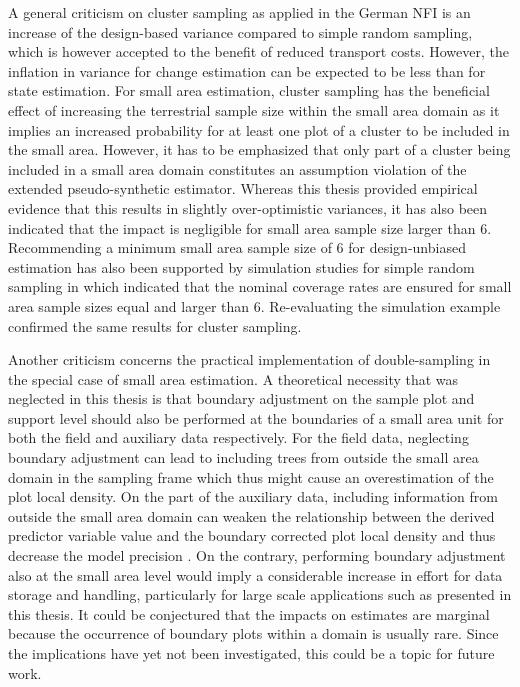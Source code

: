 A general criticism on cluster sampling as applied in the German NFI is an increase of the design-based variance compared to simple random sampling, which is however accepted to the benefit of reduced transport costs. However, the inflation in variance for change estimation can be expected to be less than for state estimation. For small area estimation, cluster sampling has the beneficial effect of increasing the terrestrial sample size within the small area domain as it implies an increased probability for at least one plot of a cluster to be included in the small area. However, it has to be emphasized that only part of a cluster being included in a small area domain constitutes an assumption violation of the extended pseudo-synthetic estimator. Whereas this thesis provided empirical evidence that this results in slightly over-optimistic variances, it has also been indicated that the impact is negligible for small area sample size larger than 6. Recommending a minimum small area sample size of 6 for design-unbiased estimation has also been supported by simulation studies for simple random sampling in \citet{mandallaz2013b} which indicated that the nominal coverage rates are ensured for small area sample sizes equal and larger than 6. Re-evaluating the simulation example confirmed the same results for cluster sampling.\par 

Another criticism concerns the practical implementation of double-sampling in the special case of small area estimation. A theoretical necessity that was neglected in this thesis is that boundary adjustment on the sample plot and support level should also be performed at the boundaries of a small area unit for both the field and auxiliary data respectively. For the field data, neglecting boundary adjustment can lead to including trees from outside the small area domain in the sampling frame which thus might cause an overestimation of the plot local density. On the part of the auxiliary data, including information from outside the small area domain can weaken the relationship between the derived predictor variable value and the boundary corrected plot local density and thus decrease the model precision \citep{mandallaz2013b}. On the contrary, performing boundary adjustment also at the small area level would imply a considerable increase in effort for data storage and handling, particularly for large scale applications such as presented in this thesis. It could be conjectured that the impacts on estimates are marginal because the occurrence of boundary plots within a domain is usually rare. Since the implications have yet not been investigated, this could be a topic for future work.\par

